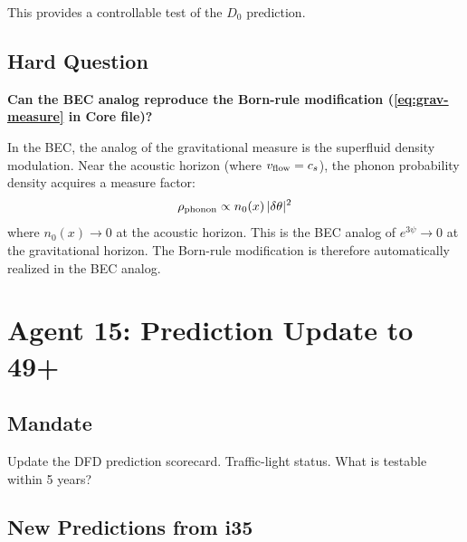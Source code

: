 \documentclass[11pt,a4paper]{article}
\begin{document}
This provides a controllable test of the $D_0$ prediction.

\subsection{Hard Question}

\textbf{Can the BEC analog reproduce the Born-rule modification (\ref{eq:grav-measure} in Core file)?}

In the BEC, the analog of the gravitational measure is the superfluid density modulation. Near the acoustic horizon (where $v_{\rm flow} = c_s$), the phonon probability density acquires a measure factor:
\begin{equation}
\rho_{\rm phonon} \propto n_0(x)\,|\delta\theta|^2
\end{equation}
where $n_0(x) \to 0$ at the acoustic horizon. This is the BEC analog of $e^{3\psi} \to 0$ at the gravitational horizon. The Born-rule modification is therefore automatically realized in the BEC analog.

\newpage
\section{Agent 15: Prediction Update to 49+}
\label{sec:agent15}

\subsection{Mandate}

Update the DFD prediction scorecard. Traffic-light status. What is testable within 5 years?

\subsection{New Predictions from i35}
\end{document}
